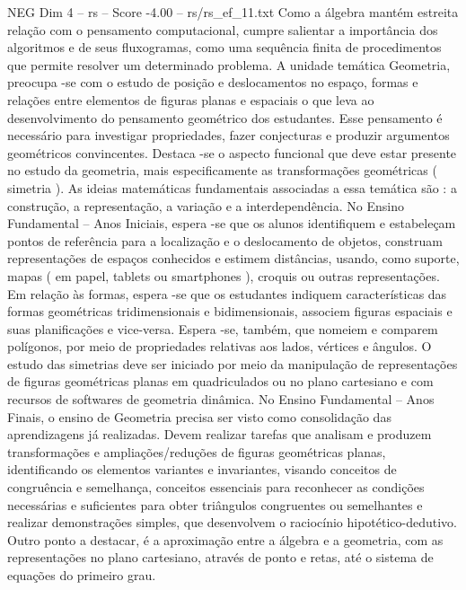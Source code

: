 \begin{textsample}{NEG Dim 4 – rs – Score -4.00 – rs/rs\_ef\_11.txt}
Como a álgebra mantém estreita relação com o pensamento computacional, cumpre salientar a importância dos algoritmos e de seus fluxogramas, como uma sequência finita de procedimentos que permite resolver um determinado problema.
A unidade temática Geometria, preocupa -se com o estudo de posição e deslocamentos no espaço, formas e relações entre elementos de figuras planas e espaciais o que leva ao desenvolvimento do pensamento geométrico dos estudantes.
Esse pensamento é necessário para investigar propriedades, fazer conjecturas e produzir argumentos geométricos convincentes.
Destaca -se o aspecto funcional que deve estar presente no estudo da geometria, mais especificamente as transformações geométricas ( simetria ).
As ideias matemáticas fundamentais associadas a essa temática são : a construção, a representação, a variação e a interdependência.
No Ensino Fundamental – Anos Iniciais, espera -se que os alunos identifiquem e estabeleçam pontos de referência para a localização e o deslocamento de objetos, construam representações de espaços conhecidos e estimem distâncias, usando, como suporte, mapas ( em papel, tablets ou smartphones ), croquis ou outras representações.
Em relação às formas, espera -se que os estudantes indiquem características das formas geométricas tridimensionais e bidimensionais, associem figuras espaciais e suas planificações e vice-versa.
Espera -se, também, que nomeiem e comparem polígonos, por meio de propriedades relativas aos lados, vértices e ângulos.
O estudo das simetrias deve ser iniciado por meio da manipulação de representações de figuras geométricas planas em quadriculados ou no plano cartesiano e com recursos de softwares de geometria dinâmica.
No Ensino Fundamental – Anos Finais, o ensino de Geometria precisa ser visto como consolidação das aprendizagens já realizadas.
Devem realizar tarefas que analisam e produzem transformações e ampliações/reduções de figuras geométricas planas, identificando os elementos variantes e invariantes, visando conceitos de congruência e semelhança, conceitos essenciais para reconhecer as condições necessárias e suficientes para obter triângulos congruentes ou semelhantes e realizar demonstrações simples, que desenvolvem o raciocínio hipotético-dedutivo.
Outro ponto a destacar, é a aproximação entre a álgebra e a geometria, com as representações no plano cartesiano, através de ponto e retas, até o sistema de equações do primeiro grau.

\end{textsample}
